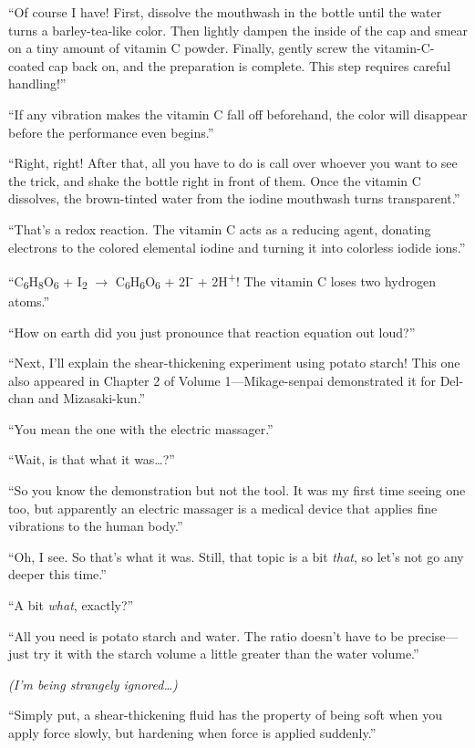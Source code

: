 \documentclass[
    a4paper,
    12pt,
    twoside,
    openany,
    UTF8,
    fontset=windows
]{ctexbook}
\begin{document}
``Of course I have! First, dissolve the mouthwash in the bottle until the water turns a barley-tea-like color. Then lightly dampen the inside of the cap and smear on a tiny amount of vitamin C powder. Finally, gently screw the vitamin-C-coated cap back on, and the preparation is complete. This step requires careful handling!''

``If any vibration makes the vitamin C fall off beforehand, the color will disappear before the performance even begins.''

``Right, right! After that, all you have to do is call over whoever you want to see the trick, and shake the bottle right in front of them. Once the vitamin C dissolves, the brown-tinted water from the iodine mouthwash turns transparent.''

``That's a redox reaction. The vitamin C acts as a reducing agent, donating electrons to the colored elemental iodine and turning it into colorless iodide ions.''

``C\textsubscript{6}H\textsubscript{8}O\textsubscript{6} + I\textsubscript{2} $\rightarrow$ C\textsubscript{6}H\textsubscript{6}O\textsubscript{6} + 2I\textsuperscript{-} + 2H\textsuperscript{+}! The vitamin C loses two hydrogen atoms.''

``How on earth did you just pronounce that reaction equation out loud?''

``Next, I'll explain the shear-thickening experiment using potato starch! This one also appeared in Chapter 2 of Volume 1---Mikage-senpai demonstrated it for Del-chan and Mizasaki-kun.''

``You mean the one with the electric massager.''

``Wait, is that what it was\dots?''

``So you know the demonstration but not the tool. It was my first time seeing one too, but apparently an electric massager is a medical device that applies fine vibrations to the human body.''

``Oh, I see. So that's what it was. Still, that topic is a bit \textit{that}, so let's not go any deeper this time.''

``A bit \textit{what}, exactly?''

``All you need is potato starch and water. The ratio doesn't have to be precise---just try it with the starch volume a little greater than the water volume.''

\textit{(I'm being strangely ignored\dots)}

``Simply put, a shear-thickening fluid has the property of being soft when you apply force slowly, but hardening when force is applied suddenly.''
\end{document}
